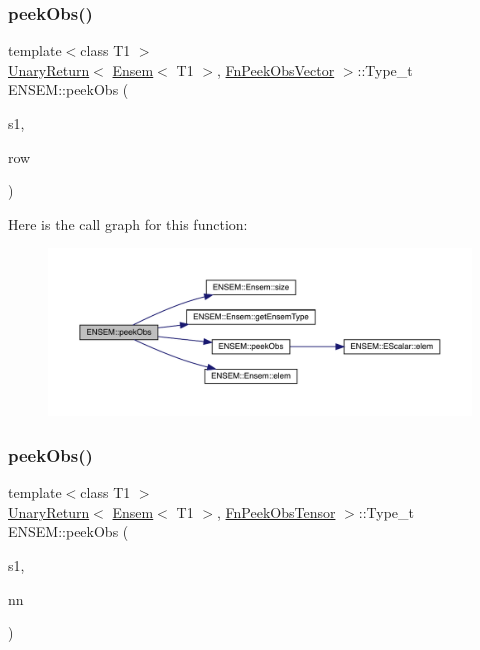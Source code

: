 \subsubsection{\texorpdfstring{peekObs()}{peekObs()}\hspace{0.1cm}{\footnotesize\ttfamily [1/2]}}
{\footnotesize\ttfamily template$<$class T1 $>$ \\
\mbox{\hyperlink{structENSEM_1_1UnaryReturn}{Unary\+Return}}$<$ \mbox{\hyperlink{classENSEM_1_1Ensem}{Ensem}}$<$ T1 $>$, \mbox{\hyperlink{structENSEM_1_1FnPeekObsVector}{Fn\+Peek\+Obs\+Vector}} $>$\+::Type\+\_\+t E\+N\+S\+E\+M\+::peek\+Obs (\begin{DoxyParamCaption}\item[{const \mbox{\hyperlink{classENSEM_1_1Ensem}{Ensem}}$<$ T1 $>$ \&}]{s1,  }\item[{int}]{row }\end{DoxyParamCaption})\hspace{0.3cm}{\ttfamily [inline]}}

Here is the call graph for this function\+:\nopagebreak
\begin{figure}[H]
\begin{center}
\leavevmode
\includegraphics[width=350pt]{d1/d9e/group__eensem_gab81975329321ddb7926b2822e0c53a8e_cgraph}
\end{center}
\end{figure}
\mbox{\label{group__eensem_gadb8dd6729310042f809bf94db594bc5b}} 
\subsubsection{\texorpdfstring{peekObs()}{peekObs()}\hspace{0.1cm}{\footnotesize\ttfamily [2/2]}}
{\footnotesize\ttfamily template$<$class T1 $>$ \\
\mbox{\hyperlink{structENSEM_1_1UnaryReturn}{Unary\+Return}}$<$ \mbox{\hyperlink{classENSEM_1_1Ensem}{Ensem}}$<$ T1 $>$, \mbox{\hyperlink{structENSEM_1_1FnPeekObsTensor}{Fn\+Peek\+Obs\+Tensor}} $>$\+::Type\+\_\+t E\+N\+S\+E\+M\+::peek\+Obs (\begin{DoxyParamCaption}\item[{const \mbox{\hyperlink{classENSEM_1_1Ensem}{Ensem}}$<$ T1 $>$ \&}]{s1,  }\item[{const \mbox{\hyperlink{classXMLArray_1_1Array}{Array}}$<$ int $>$ \&}]{nn }\end{DoxyParamCaption})\hspace{0.3cm}{\ttfamily [inline]}}

